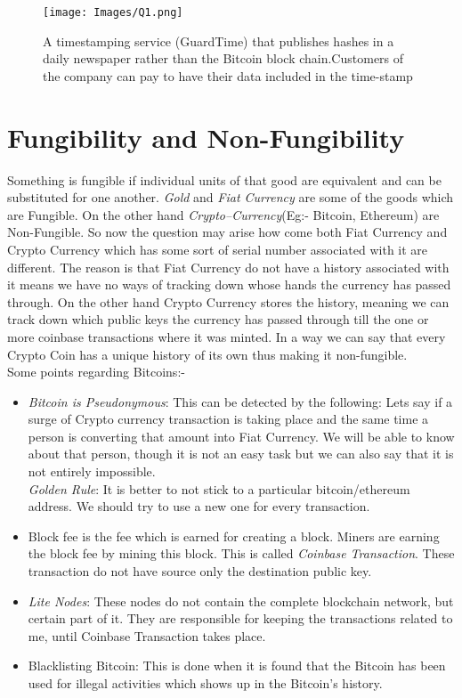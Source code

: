 \documentclass[10pt,a4paper]{article}
\begin{document}
\begin{figure}[H]
  \centering
  \texttt{[image: Images/Q1.png]}
  \caption{A timestamping service (GuardTime) that publishes hashes in a daily newspaper rather than the Bitcoin block chain.Customers of the company can pay to have their data included in the
time-stamp \cite{b2}}
  \label{Q1}
\end{figure}



\section{Fungibility and Non-Fungibility}
Something is fungible if individual units of that good are equivalent and can be substituted for one another. \textit{Gold} and \textit{Fiat Currency} are some of the goods which are Fungible. On the other hand \textit{Crypto--Currency}(Eg:- Bitcoin, Ethereum) are Non-Fungible. So now the question may arise how come both Fiat Currency and Crypto Currency which has some sort of serial number associated with it are different. The reason is that Fiat Currency do not have a history associated with it means we have no ways of tracking down whose hands the currency has passed through. On the other hand Crypto Currency stores the history, meaning we can track down which public keys the currency has passed through till the one or more coinbase transactions where it was minted. In a way we can say that every Crypto Coin has a unique history of its own thus making it non-fungible.
\\

Some points regarding Bitcoins:-
\begin{itemize}
    \item \textit{Bitcoin is Pseudonymous}: This can be detected by the following: Lets say if a surge of Crypto currency transaction is taking place and the same time a person is converting that amount into Fiat Currency. We will be able to know about that person, though it is not an easy task but we can also say that it is not entirely impossible. 
    \\
    \textit{Golden Rule}: It is better to not stick to a particular bitcoin/ethereum address. We should try to use a new one for every transaction.
    \item Block fee is the fee which is earned for creating a block. Miners are earning the block fee by mining this block. This is called \textit{Coinbase Transaction}. These transaction do not have source only the destination public key.
    \item \textit{Lite Nodes}: These nodes do not contain the complete blockchain network, but certain part of it. They are responsible for keeping the transactions related to me, until Coinbase Transaction takes place.
    \item {Blacklisting Bitcoin}: This is done when it is found that the Bitcoin has been used for illegal activities which shows up in the Bitcoin's history.
\end{itemize}
\end{document}

